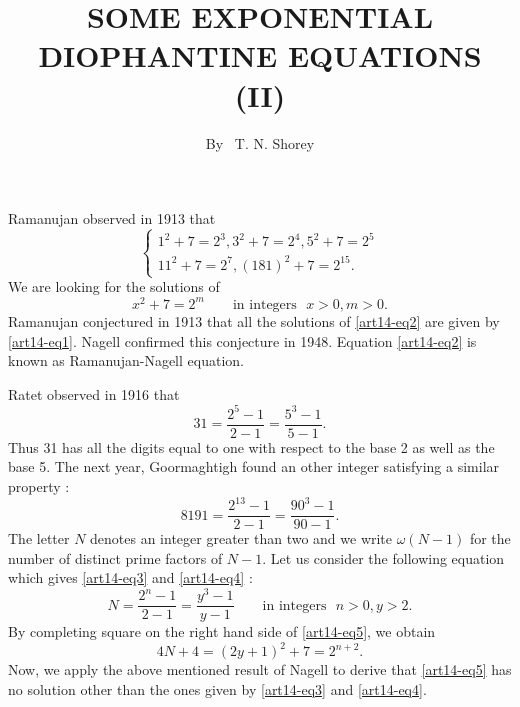 \title{SOME EXPONENTIAL DIOPHANTINE EQUATIONS (II)}

\author{By~ T. N. Shorey}

\date{}
\maketitle

\setcounter{page}{258} 
\setcounter{pageoriginal}{216}
\section{}\label{art14-sec1}\pageoriginale
Ramanujan \cite{art14-key19} observed in 1913 that
\begin{equation}
\begin{cases}
1^{2}+7=2^{3}, 3^{2}+7=2^{4}, 5^{2}+7=2^{5}\\
11^{2}+7=2^{7}, (181)^{2}+7=2^{15}.
\end{cases}\label{art14-eq1}
\end{equation}
We are looking for the solutions of
\begin{equation}
x^{2}+7=2^{m}\qquad\text{in integers~ } x>0, m>0.\label{art14-eq2}
\end{equation}
Ramanujan \cite{art14-key19} conjectured in 1913 that all the solutions of \eqref{art14-eq2} are given by \eqref{art14-eq1}. Nagell \cite{art14-key17} confirmed this conjecture in 1948. Equation \eqref{art14-eq2} is known as Ramanujan-Nagell equation.

Ratet \cite{art14-key20} observed in 1916 that
\begin{equation}
31=\frac{2^{5}-1}{2-1}=\dfrac{5^{3}-1}{5-1}.\label{art14-eq3}
\end{equation}
Thus 31 has all the digits equal to one with respect to the base 2 as well as the base 5. The next year, Goormaghtigh \cite{art14-key11} found an other integer satisfying a similar property :
\begin{equation}
8191=\frac{2^{13}-1}{2-1}=\dfrac{90^{3}-1}{90-1}.\label{art14-eq4}
\end{equation}
The letter $N$ denotes an integer greater than two and we write $\omega(N-1)$ for the number of distinct prime factors of $N-1$. Let us consider the following equation which gives \eqref{art14-eq3} and \eqref{art14-eq4} :
\begin{equation}
N=\frac{2^{n}-1}{2-1}=\dfrac{y^{3}-1}{y-1}\qquad\text{in integers~ } n>0, y>2.\label{art14-eq5}
\end{equation}
By completing square on the right hand side of \eqref{art14-eq5}, we obtain
$$
4N+4=(2y+1)^{2}+7=2^{n+2}.
$$
Now, we apply the above mentioned result of Nagell to derive that \eqref{art14-eq5} has no solution other than the ones given by \eqref{art14-eq3} and \eqref{art14-eq4}.


